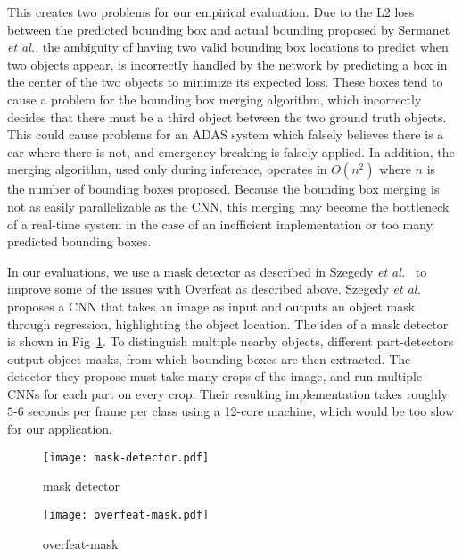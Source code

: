 \documentclass[journal]{IEEEtran}
\begin{document}
This creates two problems for our empirical evaluation. Due to the L2 loss between the predicted bounding box and actual bounding proposed by Sermanet \textit{et al.}, the ambiguity of having two valid bounding box locations to predict when two objects appear, is incorrectly handled by the network by predicting a box in the center of the two objects to minimize its expected loss. These boxes tend to cause a problem for the bounding box merging algorithm, which incorrectly decides that there must be a third object between the two ground truth objects. This could cause problems for an ADAS system which falsely believes there is a car where there is not, and emergency breaking is falsely applied. In addition, the merging algorithm, used only during inference, operates in $O(n^2)$ where $n$ is the number of bounding boxes proposed. Because the bounding box merging is not as easily parallelizable as the CNN, this merging may become the bottleneck of a real-time system in the case of an inefficient implementation or too many predicted bounding boxes.

In our evaluations, we use a mask detector as described in Szegedy \textit{et al.}~\cite{szegedy-2013} to improve some of the issues with Overfeat as described above. Szegedy \textit{et al.} proposes a CNN that takes an image as input and outputs an object mask through regression, highlighting the object location. The idea of a mask detector is shown in Fig~\ref{fig:mask-detector}. To distinguish multiple nearby objects, different part-detectors output object masks, from which bounding boxes are then extracted. The detector they propose must take many crops of the image, and run multiple CNNs for each part on every crop. Their resulting implementation takes roughly $5$-$6$ seconds per frame per class using a 12-core machine, which would be too slow for our application.

\begin{figure}[tb]
  \centering
    \texttt{[image: mask-detector.pdf]}
 \caption{mask detector}
 \label{fig:mask-detector}
\end{figure}


\begin{figure*}[tb]
  \centering
    \texttt{[image: overfeat-mask.pdf]}
 \caption{overfeat-mask}
 \label{fig:overfeat-mask}
\end{figure*}
\end{document}
